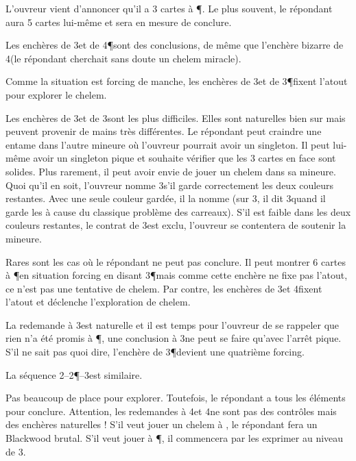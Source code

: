 \begin{multicols}{2}
L'ouvreur vient d'annoncer qu'il a 3 cartes à \P. Le plus souvent, le répondant aura 5 cartes lui-même et sera en mesure de conclure.

Les enchères de 3\NT et de 4\P sont des conclusions, de même que l'enchère bizarre de 4\C (le répondant cherchait sans doute un chelem miracle).

Comme la situation est forcing de manche, les enchères de 3\C et de 3\P fixent l'atout pour explorer le chelem.

Les enchères de 3\T et de 3\K sont les plus difficiles. Elles sont naturelles bien sur mais peuvent provenir de mains très différentes.
Le répondant peut craindre une entame dans l'autre mineure où l'ouvreur pourrait avoir un singleton. Il peut lui-même avoir un singleton pique et souhaite vérifier que les 3 cartes en face sont solides. Plus rarement, il peut avoir envie de jouer un chelem dans sa mineure.
Quoi qu'il en soit, l'ouvreur nomme 3\NT s'il garde correctement les deux couleurs restantes. Avec une seule couleur gardée, il la nomme (sur 3\K, il dit 3\C quand il garde les \T à cause du classique problème des carreaux). S'il est faible dans les deux couleurs restantes, le contrat de 3\NT est exclu, l'ouvreur se contentera de soutenir la mineure.


\end{multicols}
\titre{2\C--2\P--3\T}
\begin{multicols}{2}
Rares sont les cas où le répondant ne peut pas conclure. Il peut montrer 6 cartes à \P en situation forcing en disant 3\P mais comme cette enchère ne fixe pas l'atout, ce n'est pas une tentative de chelem. Par contre, les enchères de 3\C et 4\T fixent l'atout et déclenche l'exploration de chelem.

La redemande à 3\K est naturelle et il est temps pour l'ouvreur de se rappeler que rien n'a été promis à \P, une conclusion à 3\NT ne peut se faire qu'avec l'arrêt pique. S'il ne sait pas quoi dire, l'enchère de 3\P devient une quatrième forcing.

La séquence 2\C--2\P--3\K est similaire.



\end{multicols}
\titre{2\C--2\P--3\C}
\begin{multicols}{2}

Pas beaucoup de place pour explorer. Toutefois, le répondant a tous les éléments pour conclure. Attention, les redemandes à 4\T et 4\K ne sont pas des contrôles mais des enchères naturelles ! S'il veut jouer un chelem à \C, le répondant fera un Blackwood brutal. S'il veut jouer à \P, il commencera par les exprimer au niveau de 3.

\end{multicols}

